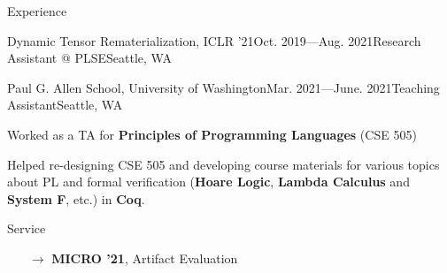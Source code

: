 \documentclass{resume}
\begin{document}
\begin{rSection}{Experience}
\begin{rSubsection}{Dynamic Tensor Rematerialization, ICLR '21}{Oct. 2019---Aug. 2021}{Research Assistant @ PLSE}{Seattle, WA}
        \end{rSubsection}
        \vspace{-5pt}
		\begin{rSubsection}{Paul G. Allen School, University of Washington}{Mar. 2021---June. 2021}{Teaching Assistant}{Seattle, WA}
			\item Worked as a TA for \textbf{Principles of Programming Languages} (CSE 505)
			\item Helped re-designing CSE 505 and developing course materials for various topics about PL and formal verification (\textbf{Hoare Logic}, \textbf{Lambda Calculus} and \textbf{System F}, etc.) in \textbf{Coq}.
		\end{rSubsection}
    \end{rSection}
	\vspace{-5pt}
	\begin{rSection}{Service}
    	\begin{enumerate}
    		\setlength{\itemsep}{1pt}
            \setlength{\parskip}{0pt}
    		\setlength{\parsep}{0pt}
    		\item[$\rightarrow$] \textbf{MICRO '21}, Artifact Evaluation
    	\end{enumerate}
	\end{rSection}
\end{document}
